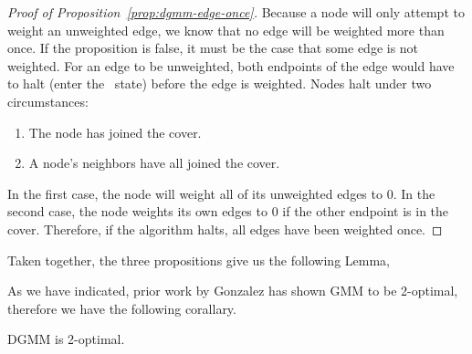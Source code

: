   \begin{proof}[Proof of Proposition~\ref{prop:dgmm-edge-once}]
    Because a node will only attempt to weight an unweighted edge, we know that no edge will be weighted more than once. If the proposition is false, it must be the case that some edge is not weighted.
    For an edge to be unweighted, both endpoints of the edge would have to halt (enter the \cDd\ state) before the edge is weighted. Nodes halt under two circumstances:
    \begin{enumerate}
    \item The node has joined the cover.
    \item A node's neighbors have all joined the cover.
    \end{enumerate}
    In the first case, the node will weight all of its unweighted edges to 0. In the second case, the node weights its own edges to 0 if the other endpoint is in the cover.
    Therefore, if the algorithm halts, all edges have been weighted once.
  \end{proof}
  
  Taken together, the three propositions give us the following Lemma,
  

  As we have indicated, prior work by Gonzalez has shown GMM to be 2-optimal, therefore we have the following corallary.
\begin{corr}\label{cor:dgmm-two}DGMM is 2-optimal.\end{corr}
